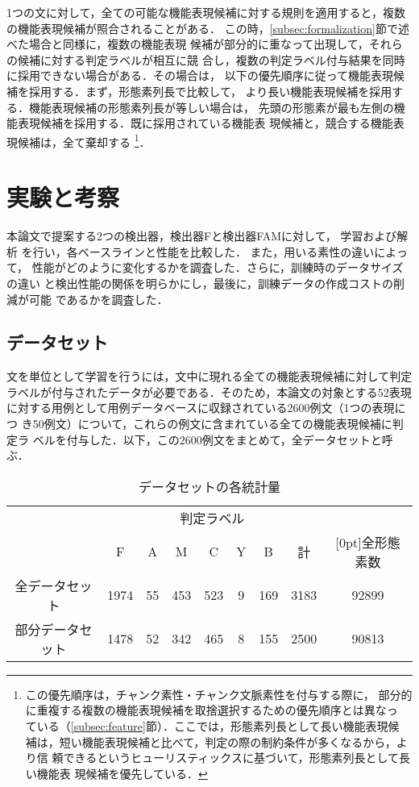 \documentclass[japanese]{jnlp_1.2d}
\begin{document}
1つの文に対して，全ての可能な機能表現候補に対する規則を適用すると，複数
の機能表現候補が照合されることがある．
この時，\ref{subsec:formalization}節で述べた場合と同様に，複数の機能表現
候補が部分的に重なって出現して，それらの候補に対する判定ラベルが相互に競
合し，複数の判定ラベル付与結果を同時に採用できない場合がある．その場合は，
以下の優先順序に従って機能表現候補を採用する．まず，形態素列長で比較して，
より長い機能表現候補を採用する．機能表現候補の形態素列長が等しい場合は，
先頭の形態素が最も左側の機能表現候補を採用する．既に採用されている機能表
現候補と，競合する機能表現候補は，全て棄却する
\footnote {この優先順序は，チャンク素性・チャンク文脈素性を付与する際に，
部分的に重複する複数の機能表現候補を取捨選択するための優先順序とは異なっ
ている（\ref{subsec:feature}節）．ここでは，形態素列長として長い機能表現候
補は，短い機能表現候補と比べて，判定の際の制約条件が多くなるから，より信
頼できるというヒューリスティックスに基づいて，形態素列長として長い機能表
現候補を優先している．}．



\section{実験と考察}
\label{sec:実験と考察}

本論文で提案する2つの検出器，検出器Fと検出器FAMに対して，
学習および解析
を行い，各ベースラインと性能を比較した．
\pagebreak
また，用いる素性の違いによって，
性能がどのように変化するかを調査した．さらに，訓練時のデータサイズの違い
と検出性能の関係を明らかにし，最後に，訓練データの作成コストの削減が可能
であるかを調査した．

\subsection{データセット}
\label{subsec:dataset}

文を単位として学習を行うには，文中に現れる全ての機能表現候補に対して判定
ラベルが付与されたデータが必要である．そのため，本論文の対象とする52表現
に対する用例として用例データベースに収録されている2600例文（1つの表現につ
き50例文）について，これらの例文に含まれている全ての機能表現候補に判定ラ
ベルを付与した．以下，この2600例文をまとめて，全データセットと呼ぶ．


\begin{table}[b]
  \caption{データセットの各統計量}
  \label{tab:dataset}
  \begin{center}
    \begin{tabular}{@{}c||c|c|c|c|c|c|c||c@{}} \hline
      & \multicolumn{7}{c||}{判定ラベル} & \\ \cline{2-7}
      & F & A & M & C & Y & B & 計 & \raisebox{1.5ex}[0pt]{全形態素数} \\ \hline
      全データセット & 1974 & 55 & 453 & 523 & 9 & 169 & 3183 & 92899 \\
      部分データセット & 1478 & 52 & 342 & 465 & 8 & 155 & 2500 & 90813 \\ \hline
    \end{tabular}
  \end{center}
\end{table}
\end{document}
